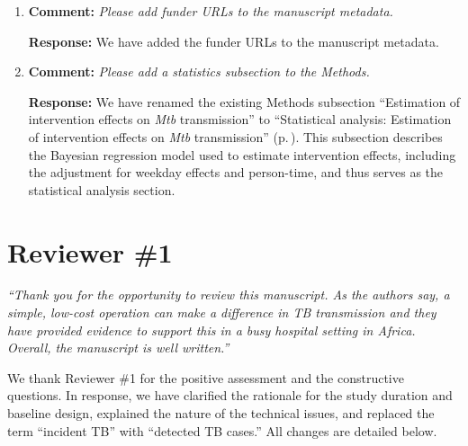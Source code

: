 \documentclass[11pt]{article}
\newcommand{\comment}[1]{\textbf{Comment:} \textit{#1}}
\newcommand{\response}[1]{\textbf{Response:} #1}
\begin{document}
\begin{enumerate}[label=\textbf{E\arabic*.}, leftmargin=*]
\response{We have deposited the code and preprocessed data (see \ref{r:E1}) in a linked OSF and GitHub repository. The DOI is: \url{https://doi.org/10.17605/OSF.IO/P3W24}.}

\item\label{r:E3} \comment{Please add funder URLs to the manuscript metadata.}

\response{We have added the funder URLs to the manuscript metadata.}

\item\label{r:E4} \comment{Please add a statistics subsection to the Methods.}

\response{We have renamed the existing Methods subsection ``Estimation of intervention effects on \emph{Mtb} transmission'' to ``Statistical analysis: Estimation of intervention effects on \emph{Mtb} transmission'' (p.\,\pageref{chg:E4}). This subsection describes the Bayesian regression model used to estimate intervention effects, including the adjustment for weekday effects and person-time, and thus serves as the statistical analysis section.}

\end{enumerate}

\clearpage

\section*{Reviewer \#1}

\noindent\textit{``Thank you for the opportunity to review this manuscript. As the authors say, a simple, low-cost operation can make a difference in TB transmission and they have provided evidence to support this in a busy hospital setting in Africa. Overall, the manuscript is well written.''}

\medskip
\noindent We thank Reviewer \#1 for the positive assessment and the constructive questions. In response, we have clarified the rationale for the study duration and baseline design, explained the nature of the technical issues, and replaced the term ``incident TB'' with ``detected TB cases.'' All changes are detailed below.
\end{document}
